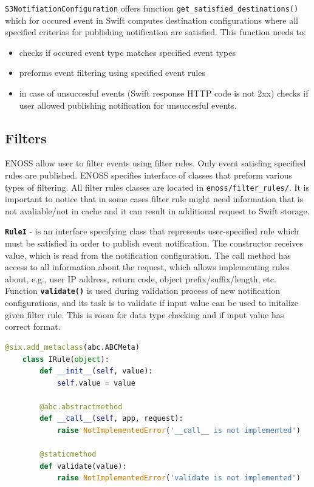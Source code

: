     \texttt{S3NotifiationConfiguration} offers function \texttt{get\_satisfied\_destinations()} which for occured event in Swift computes destination configurations where all specified criterias for publishing notification are satisfied. This function needs to:
    \begin{itemize}
        \item checks if occured event type matches specified event types
        \item preforms event filtering using specified event rules
        \item in case of unsuccesful events (Swift response HTTP code is not 2xx) checks if user allowed publishing notification for unsuccesful events.
    \end{itemize}

    \subsection{Filters}
    ENOSS allow user to filter events using filter rules. Only event satisfing specified rules are published. ENOSS specifies interface of classes that preform various types of filtering. All filter rules classes are located in \texttt{enoss/filter\_rules/}. It is important to notice that in some cases filter rule might need information that is not avaliable/not in cache and it can result in additional request to Swift storage.

    \textbf{\texttt{RuleI}} - is an interface specifying class that represents user-specified rule which must be satisfied in order to publish event notification. The constructor receives value, which is read from the notification configuration. The call method has access to all information about the request, which allows implementing rules about, e.g., user IP address, return code, object prefix/suffix/length, etc. Function \textbf{\texttt{validate()}} is used during validation process of new notification configurations, and its task is to validate if input value can be used to initalize given filter rule. This is room for data type checking and if input value has correct format.

    \begin{lstlisting}[language=Python, style=pythonStyle, caption=Interface of class representing filter rule., label=lst:enoss-rulei]
    @six.add_metaclass(abc.ABCMeta)
    class IRule(object):
        def __init__(self, value):
            self.value = value

        @abc.abstractmethod
        def __call__(self, app, request):
            raise NotImplementedError('__call__ is not implemented')

        @staticmethod
        def validate(value):
            raise NotImplementedError('validate is not implemented')
    \end{lstlisting}

